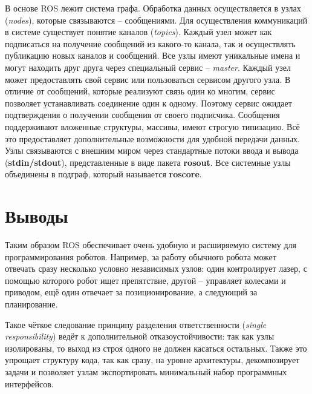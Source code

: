 В основе ROS лежит система графа. Обработка данных осуществляется в узлах (\textit{nodes}), которые связываются  -- сообщениями. Для осуществления коммуникаций в системе существует понятие каналов (\textit{topics}). Каждый узел может как подписаться на получение сообщений из какого-то канала, так и осуществлять публикацию новых каналов и сообщений. Все узлы имеют уникальные имена и могут находить друг друга через специальный сервис -- \textit{master}. Каждый узел может предоставлять свой сервис или пользоваться сервисом другого узла. В отличие от сообщений, которые реализуют связь один ко многим, сервис позволяет устанавливать соединение один к одному. Поэтому сервис ожидает подтверждения о получении сообщения от своего подписчика. Сообщения поддерживают вложенные структуры, массивы, имеют строгую типизацию. Всё это предоставляет дополнительные возможности для удобной передачи данных. Узлы связываются с внешним миром через стандартные потоки ввода и вывода (\textbf{stdin/stdout}), представленные в виде пакета \textbf{rosout}. Все системные узлы объединены в подграф, который называется \textbf{roscore}.

\section{Выводы}

Таким образом ROS обеспечивает очень удобную и расширяемую систему для программирования роботов. Например, за работу обычного робота может отвечать сразу несколько условно независимых узлов: один контролирует лазер, с помощью которого робот ищет препятствие, другой -- управляет колесами и приводом, ещё один отвечает за позиционирование, а следующий за планирование.

Такое чёткое следование принципу разделения ответственности (\textit{single responsibility}) ведёт к дополнительной отказоустойчивости: так как узлы изолированы, то выход из строя одного не должен касаться остальных. Также это упрощает структуру кода, так как сразу, на уровне архитектуры, декомпозирует задачи и позволяет узлам экспортировать минимальный набор программных интерфейсов.
